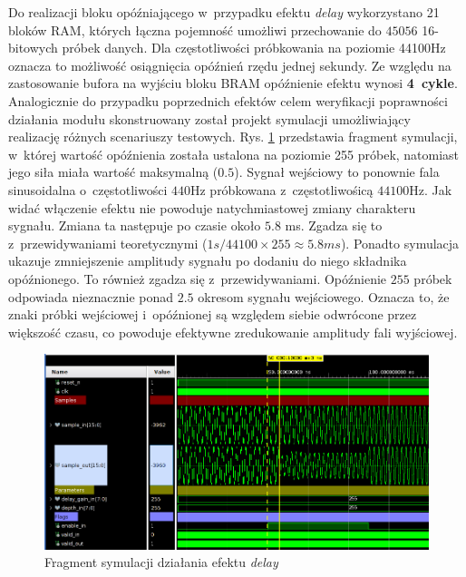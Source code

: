 Do realizacji bloku opóźniającego w~przypadku efektu \textit{delay} wykorzystano 21 bloków RAM, których łączna pojemność umożliwi przechowanie do $45056$ 16-bitowych próbek danych. Dla częstotliwości próbkowania na poziomie 44100Hz oznacza to możliwość osiągnięcia opóźnień rzędu jednej sekundy. Ze względu na zastosowanie bufora na wyjściu bloku BRAM opóźnienie efektu wynosi \textbf{4~cykle}. Analogicznie do przypadku poprzednich efektów celem weryfikacji poprawności działania modułu skonstruowany został projekt symulacji umożliwiający realizację różnych scenariuszy testowych. Rys. \ref{sim-delay} przedstawia fragment symulacji, w~której wartość opóźnienia została ustalona na poziomie 255 próbek, natomiast jego siła miała wartość maksymalną ($0.5$). Sygnał wejściowy to ponownie fala sinusoidalna o~częstotliwości $440$Hz próbkowana z~częstotliwośicą $44100$Hz. Jak widać włączenie efektu nie powoduje natychmiastowej zmiany charakteru sygnału. Zmiana ta następuje po czasie około $5.8$ ms. Zgadza się to z~przewidywaniami teoretycznymi ($1s / 44100 \times 255 \approx 5.8 ms$). Ponadto symulacja ukazuje zmniejszenie amplitudy sygnału po dodaniu do niego składnika opóźnionego. To również zgadza się z~przewidywaniami. Opóźnienie $255$ próbek odpowiada nieznacznie ponad $2.5$ okresom sygnału wejściowego. Oznacza to, że znaki próbki wejściowej i~opóźnionej są względem siebie odwrócone przez większość czasu, co powoduje efektywne zredukowanie amplitudy fali wyjściowej.

\vspace{0.5cm}
\begin{figure}[ht]
    \centering
    \includegraphics[width=\textwidth]{img/sim/delay_sim_high_gain.png}
    \captionsetup{format=plain,justification=centering}
    \caption{Fragment symulacji działania efektu \textit{delay}}
    \label{sim-delay}
\end{figure}
\vspace{0.5cm}